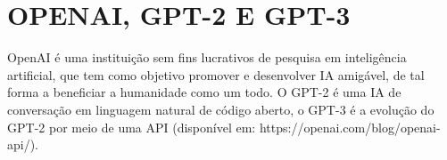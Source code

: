 \section{OPENAI, GPT-2 E GPT-3}
\label{sec:OPENAI}

OpenAI é uma instituição sem fins lucrativos de pesquisa em inteligência artificial, que tem como objetivo promover e desenvolver IA amigável, de tal forma a beneficiar a humanidade como um todo. 
O GPT-2 é uma IA de conversação em linguagem natural de código aberto, o GPT-3 é a evolução do GPT-2 por meio de uma API (disponível em: https://openai.com/blog/openai-api/). 
